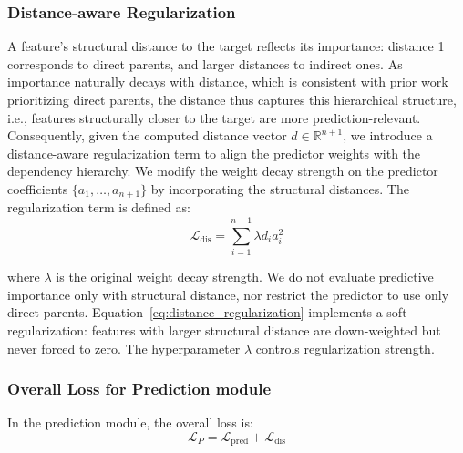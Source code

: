 \documentclass[conference]{IEEEtran}
\newcommand{\icde}[1]{{\color{black}#1}}
\newcommand{\kdd}[1]{{\color{black}#1}}
\newcommand{\syadd}[1]{{\color{black}#1}}
\newcommand{\syfix}[1]{{\color{black}#1}}
\newcommand{\syic}[1]{{\color{black}#1}}
\begin{document}
\subsubsection{Distance-aware Regularization}
\label{sec:reg}

\icde{
A feature's \syic{structural} distance to the target reflects its importance: distance 1 corresponds to \syic{direct parents}, and larger distances to indirect ones. 
As importance naturally decays with distance\cite{r:pearl2009,r:peters2017}, which is consistent with prior work prioritizing direct parents\cite{r:CASTLE,r:linear}, 
the distance thus captures this hierarchical structure, i.e., features \syic{structurally} closer to the target are more prediction-relevant.
}
Consequently, given the computed distance vector $d \in \mathbb{R}^{n+1}$, we introduce a distance-aware regularization term to \syadd{align the predictor weights with the \syic{dependency} hierarchy.} 
We modify the weight decay strength on the predictor coefficients $\{a_1, \dots, a_{n+1}\}$ by incorporating the \syic{structural} distances. The regularization term is defined as:
\begin{equation}
    \mathcal{L}_{\text{dis}} = \sum_{i=1}^{n+1} \lambda d_i a_i^2
    \label{eq:distance_regularization}
\end{equation}

\noindent
where $\lambda$ is the original weight decay strength. 
\syadd{
We do not evaluate \syfix{predictive importance} only with \syic{structural} distance, nor restrict the predictor to use only direct parents. 
Equation~\eqref{eq:distance_regularization} implements a soft regularization: features with larger \syic{structural} distance are down-weighted but never forced to zero. 
The hyperparameter $\lambda$ controls regularization strength. 
}

\subsubsection{Overall Loss for Prediction \kdd{module}}
In the \syic{prediction} module, the overall loss is:
\begin{equation}
    \mathcal{L}_{P} = \mathcal{L}_{\text{pred}} + \mathcal{L}_{\text{dis}}
    \label{eq:total_prediction_loss}
\end{equation}
\end{document}

